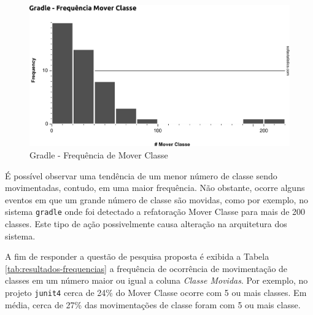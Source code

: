 \documentclass[12pt]{article}
\begin{document}
\begin{figure}[htb]
	\centering
	\includegraphics[width=0.9\linewidth]{../img/0008_Histogram_Gradle_Frequencia_Mover_Classe}
	\caption{Gradle - Frequência de Mover Classe}
	\label{fig:resultado-gradle}
\end{figure}

É possível observar uma tendência de um menor número de classe sendo movimentadas, contudo, em uma maior frequência. Não obstante, ocorre alguns eventos em que um grande número de classe são movidas, como por exemplo, no sistema \texttt{gradle} onde foi detectado a refatoração Mover Classe para mais de 200 classes. Este tipo de ação possivelmente causa alteração na arquitetura dos sistema. 

A fim de responder a questão de pesquisa proposta é exibida a Tabela \ref{tab:resultados-frequencias} a frequência de ocorrência de movimentação de classes em um número maior ou igual a coluna \textit{Classe Movidas}. Por exemplo, no projeto \texttt{junit4} cerca de 24\% do Mover Classe ocorre com 5 ou mais classes. Em média, cerca de 27\% das movimentações de classe foram com 5 ou mais classe.
\end{document}
